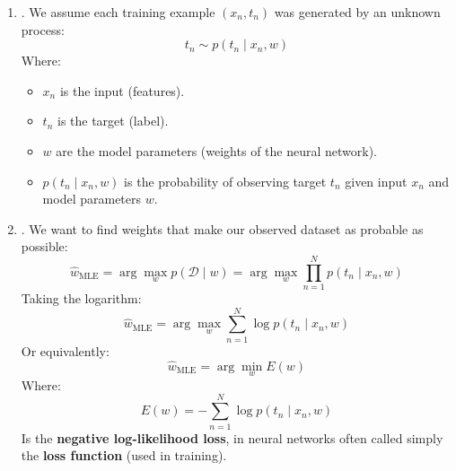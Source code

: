 \begin{enumerate}
    \item {}. We assume each training example $\left(x_{n}, t_{n}\right)$ was generated by an unknown process:
    \begin{equation*}
        t_{n} \sim p\left(t_{n} \mid x_{n}, w\right)
    \end{equation*}
    Where:
    \begin{itemize}
        \item $x_{n}$ is the input (features).
        \item $t_{n}$ is the target (label).
        \item $w$ are the model parameters (weights of the neural network).
        \item $p\left(t_{n} \mid x_{n}, w\right)$ is the probability of observing target $t_{n}$ given input $x_{n}$ and model parameters $w$.
    \end{itemize}

    \item {}. We want to find weights that make our observed dataset as probable as possible:
    \begin{equation*}
        \hat{w}_{\text{MLE}} = \arg\max_{w} p\left(\mathcal{D} \mid w\right) = \arg\max_{w} \prod_{n=1}^{N} p\left(t_{n} \mid x_{n}, w\right)
    \end{equation*}
    Taking the logarithm:
    \begin{equation*}
        \hat{w}_{\text{MLE}} = \arg\max_{w} \sum_{n=1}^{N} \log p\left(t_{n} \mid x_{n}, w\right)
    \end{equation*}
    Or equivalently:
    \begin{equation*}
        \hat{w}_{\text{MLE}} = \arg\min_{w} E(w)
    \end{equation*}
    Where:
    \begin{equation*}
        E(w) = -\sum_{n=1}^{N} \log p\left(t_{n} \mid x_{n}, w\right)
    \end{equation*}
    Is the \textbf{negative log-likelihood loss}, in neural networks often called simply the \textbf{loss function} (used in training).


\end{enumerate}
